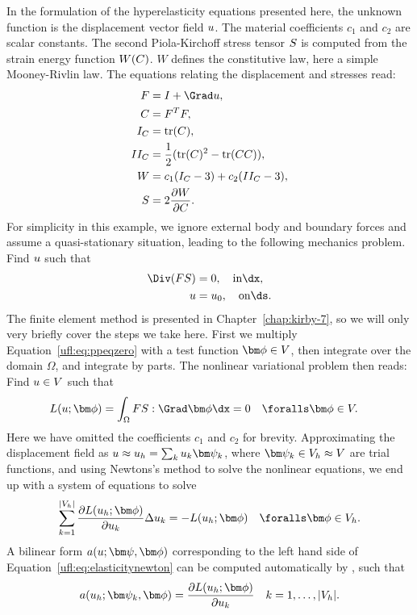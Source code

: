 In the formulation of the hyperelasticity equations presented
here, the unknown function is the displacement vector field ${u}$.
The material coefficients $c_1$ and $c_2$ are scalar constants.
The second Piola-Kirchoff stress tensor ${S}$ is computed from the
strain energy function $W({C})$. $W$ defines the constitutive law, here
a simple Mooney-Rivlin law. The equations relating the displacement and
stresses read:
\begin{align}
\begin{split}
\FF   &=  \II + \Grad \uu, \\
\CC   &=  \FF^T\FF, \\
I_C   &=  \mop{tr}(\CC), \\
II_C  &=  \frac 1 2 (\mop{tr}(\CC)^2 - \mop{tr}(\CC\CC)), \\
W     &=  c_1(I_C - 3) + c_2(II_C - 3), \\
\SS   &=  2\frac{\partial W}{\partial\CC}.  \label{ufl:eq:hypdef}
\end{split}
\end{align}
For simplicity in this example, we ignore external body and boundary
forces and assume a quasi-stationary situation, leading to the following
mechanics problem. Find ${u}$ such that
\begin{align}
\Div (\FF\SS) &= 0, \quad \mbox{in} \dx, \label{ufl:eq:ppeqzero} \\
\uu &= \uu_0,       \quad \mbox{on} \ds.
\end{align}
The finite element method is presented in Chapter~\ref{chap:kirby-7},
so we will only very briefly cover the steps we take here.  First we
multiply Equation~\eqref{ufl:eq:ppeqzero} with a test function $\bphi
\in V$, then integrate over the domain $\Omega$, and integrate by parts.
The nonlinear variational problem then reads: Find ${u} \in V$ such that
\begin{align}
L(\uu; \bphi) &= \int_\Omega \FF\SS : \Grad\bphi \dx = 0
  \quad \foralls \bphi \in V. \label{ufl:eq:hypdefL}
\end{align}
Here we have omitted the coefficients $c_1$ and $c_2$ for brevity.
Approximating the displacement field as $\uu \approx \uu_h = \sum_k
u_k \bpsi_k$, where $\bpsi_k \in V_h \approx V$ are trial functions,
and using Newtons's method to solve the nonlinear equations, we end up
with a system of equations to solve
\begin{align}
\sum_{k=1}^{|V_h|} \frac{\partial L(\uu_h; \bphi)}{\partial u_k} \Delta u_k =
  -L(\uu_h; \bphi)
  \quad \foralls \bphi \in V_h. \label{ufl:eq:elasticitynewton}
\end{align}
A bilinear form $a(\uu; \bpsi, \bphi)$ corresponding to the left hand side
of Equation~\eqref{ufl:eq:elasticitynewton} can be computed automatically
by \ufl{}, such that
\begin{align}
a(\uu_h; \bpsi_k, \bphi) = \frac{\partial L(\uu_h; \bphi)}{\partial u_k}
  \quad k = 1, \ldots, |V_h|. \label{alnes-1:eq:hypdefa}
\end{align}

